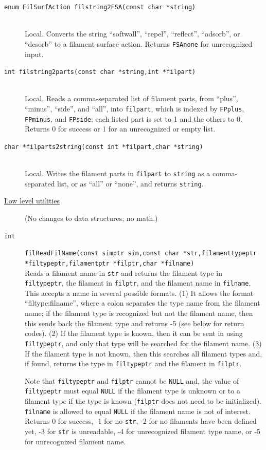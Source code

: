 \documentclass {scrbook}
\newcommand {\ttt} {\texttt}
\begin{document}
\begin{description}
\item[\ttt{enum FilSurfAction filstring2FSA(const char *string)}] %
\hfill \\
Local. Converts the string ``softwall'', ``repel'', ``reflect'', ``adsorb'', or ``desorb'' to a filament-surface action. Returns \ttt{FSAnone} for unrecognized input.

\item[\ttt{int filstring2parts(const char *string,int *filpart)}] %
\hfill \\
Local. Reads a comma-separated list of filament parts, from ``plus'', ``minus'', ``side'', and ``all'', into \ttt{filpart}, which is indexed by \ttt{FPplus}, \ttt{FPminus}, and \ttt{FPside}; each listed part is set to 1 and the others to 0. Returns 0 for success or 1 for an unrecognized or empty list.

\item[\ttt{char *filparts2string(const int *filpart,char *string)}] %
\hfill \\
Local. Writes the filament parts in \ttt{filpart} to \ttt{string} as a comma-separated list, or as ``all'' or ``none'', and returns \ttt{string}.


\item[\underline{Low level utilities}]
(No changes to data structures; no math.)

\item[\ttt{int}]
\ttt{filReadFilName(const simptr sim,const char *str,filamenttypeptr *filtypeptr,filamentptr *filptr,char *filname)}
\hfill \\
Reads a filament name in \ttt{str} and returns the filament type in \ttt{filtypeptr}, the filament in \ttt{filptr}, and the filament name in \ttt{filname}. This accepts a name in several possible formats. (1) It allows the format ``filtype:filname'', where a colon separates the type name from the filament name; if the filament type is recognized but not the filament name, then this sends back the filament type and returns -5 (see below for return codes). (2) If the filament type is known, then it can be sent in using \ttt{filtypeptr}, and only that type will be searched for the filament name. (3) If the filament type is not known, then this searches all filament types and, if found, returns the type in \ttt{filtypeptr} and the filament in \ttt{filptr}.

Note that \ttt{filtypeptr} and \ttt{filptr} cannot be \ttt{NULL} and, the value of \ttt{filtypeptr} must equal \ttt{NULL} if the filament type is unknown or to a filament type if the type is known (\ttt{filptr} does not need to be initialized). \ttt{filname} is allowed to equal \ttt{NULL} if the filament name is not of interest. Returns 0 for success, -1 for no \ttt{str}, -2 for no filaments have been defined yet, -3 for \ttt{str} is unreadable, -4 for unrecognized filament type name, or -5 for unrecognized filament name.


\end{description}
\end{document}

